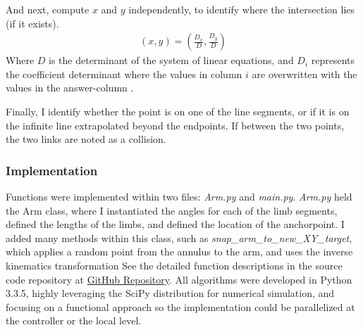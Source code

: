 \documentclass[9pt,twocolumn,twoside]{pnas-new}
\begin{document}
And next, compute $x$ and $y$ independently, to identify where the intersection lies (if it exists).
\begin{align*}
(x,y) = \left(\frac{D_x}{D}, \frac{D_y}{D}\right)
\end{align*}
Where $D$ is the determinant of the system of linear equations, and $D_i$ represents the coefficient determinant where the values in column $i$ are overwritten with the values in the answer-column \cite{strang2011introduction}. 

Finally, I identify whether the point is on one of the line segments, or if it is on the infinite line extrapolated beyond the endpoints. If between the two points, the two links are noted as a collision.
\\
\subsubsection*{Implementation}
Functions were implemented within two files: \textit{Arm.py} and \textit{main.py}. \textit{Arm.py} held the Arm class, where I instantiated the angles for each of the limb segments, defined the lengths of the limbs, and defined the location of the anchorpoint. I added many methods within this class, such as \textit{snap\_arm\_to\_new\_XY\_target}, which applies a random point from the annulus to the arm, and uses the inverse kinematics transformation 
See the detailed function descriptions in the source code repository at \href{https://github.com/bcohn12/robo-movement-feasibility}{GitHub Repository}.
All algorithms were developed in Python 3.3.5, highly leveraging the SciPy distribution for numerical simulation, and focusing on a functional approach so the implementation could be parallelized at the controller or the local level.
\end{document}
